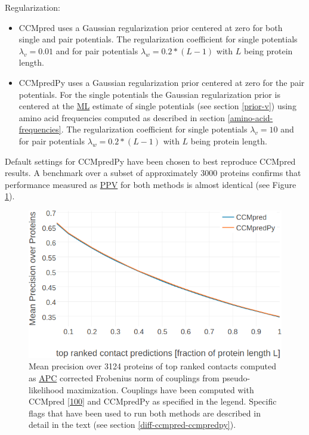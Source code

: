\documentclass[11pt,a4paper,twoside]{book}
\providecommand{\tightlist}{%
  \setlength{\itemsep}{0pt}\setlength{\parskip}{0pt}}
\theoremstyle{definition}
\theoremstyle{definition}
\theoremstyle{remark}
\begin{document}
Regularization:

\begin{itemize}
\tightlist
\item
  CCMpred uses a Gaussian regularization prior centered at zero for both
  single and pair potentials. The regularization coefficient for single
  potentials \(\lambda_v = 0.01\) and for pair potentials
  \(\lambda_w = 0.2 * (L-1)\) with \(L\) being protein length.
\item
  CCMpredPy uses a Gaussian regularization prior centered at zero for
  the pair potentials. For the single potentials the Gaussian
  regularization prior is centered at the \protect\hyperlink{abbrev}{ML}
  estimate of single potentials (see section \ref{prior-v}) using amino
  acid frequencies computed as described in section
  \ref{amino-acid-frequencies}. The regularization coefficient for
  single potentials \(\lambda_v = 10\) and for pair potentials
  \(\lambda_w = 0.2 * (L-1)\) with \(L\) being protein length.
\end{itemize}

Default settings for CCMpredPy have been chosen to best reproduce
CCMpred results. A benchmark over a subset of approximately 3000
proteins confirms that performance measured as
\protect\hyperlink{abbrev}{PPV} for both methods is almost identical
(see Figure \ref{fig:cmmpredvanilla-vs-ccmpredpy}).










\begin{figure}
\includegraphics[width=0.9\linewidth]{img/methods/ccmpredvanilla_vs_ccmpredpy_precision_vs_rank} \caption{Mean precision over 3124
proteins of top ranked contacts computed as
\protect\hyperlink{abbrev}{APC} corrected Frobenius norm of couplings
from pseudo-likelihood maximization. Couplings have been computed with
CCMpred {[}\protect\hyperlink{ref-Seemayer2014}{100}{]} and CCMpredPy as
specified in the legend. Specific flags that have been used to run both
methods are described in detail in the text (see section
\ref{diff-ccmpred-ccmpredpy}).}\label{fig:cmmpredvanilla-vs-ccmpredpy}
\end{figure}
\end{document}
